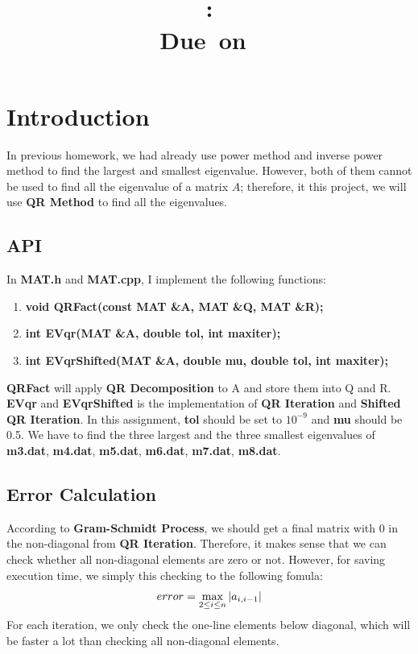 \documentclass{article}
\title{
    \vspace{2in}
    \textmd{\textbf{\hmwkClass}}\\
    \textmd{\textbf{\hmwkID: \hmwkTitle}} \\
    \normalsize\vspace{0.1in}\small{Due\ on\ \hmwkDueDate}\\
    \vspace{3in}
}
\author{\textbf{\hmwkAuthorName}}
\date{} %
\DeclarePairedDelimiter\abs{\lvert}{\rvert}%
\begin{document}
\maketitle
\newpage

\section{Introduction}
In previous homework, we had already use power method and inverse power method to find the largest and smallest eigenvalue.
However, both of them cannot be used to find all the eigenvalue of a matrix $A$; therefore, it this project, we will use
\textbf{QR Method} to find all the eigenvalues.

\subsection{API}
In \textbf{MAT.h} and \textbf{MAT.cpp}, I implement the following functions:
\begin{enumerate}
    \item \textbf{void QRFact(const MAT \&A, MAT \&Q, MAT \&R);}
    \item \textbf{int EVqr(MAT \&A, double tol, int maxiter);}
    \item \textbf{int EVqrShifted(MAT \&A, double mu, double tol, int maxiter);}
\end{enumerate}
\textbf{QRFact} will apply \textbf{QR Decomposition} to A and store them into Q and R. \textbf{EVqr} and \textbf{EVqrShifted}
is the implementation of \textbf{QR Iteration} and \textbf{Shifted QR Iteration}. In this assignment, \textbf{tol} should be set to
$10^{-9}$ and \textbf{mu} should be 0.5. We have to find the three largest and the three smallest eigenvalues of 
\textbf{m3.dat}, \textbf{m4.dat}, \textbf{m5.dat}, \textbf{m6.dat}, \textbf{m7.dat}, \textbf{m8.dat}.

\subsection{Error Calculation}
According to \textbf{Gram-Schmidt Process}, we should get a final matrix with 0 in the non-diagonal from \textbf{QR Iteration}.
Therefore, it makes sense that we can check whether all non-diagonal elements are zero or not. However, for saving execution
time, we simply this checking to the following fomula:
$$
    error = \max_{2 \leq i \leq n}{\abs{a_{i,i-1}}}
$$
For each iteration, we only check the one-line elements below diagonal, which will be faster a lot than checking all
non-diagonal elements.
\end{document}
